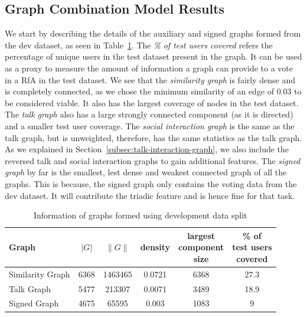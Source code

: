 \subsection{Graph Combination Model Results}
We start by describing the details of the auxiliary and signed graphs formed from the dev dataset, as seen in Table~\ref{tab:test-graphs}.
The \textit{\% of test users covered} refers the percentage of unique users in the test dataset present in the graph. 
It can be used as a proxy to measure the amount of information a graph can provide to a vote in a RfA in the test dataset.
We see that the \textit{similarity graph} is fairly dense and is completely connected, as we chose the minimum similarity of an edge of $0.03$ to be considered viable.
It also has the largest coverage of nodes in the test dataset.
The \textit{talk graph} also has a large strongly connected component (as it is directed) and a smaller test user coverage.
The \textit{social interaction graph} is the same as the talk graph, but is unweighted, therefore, has the same statistics as the talk graph.
As we explained in Section~\ref{subsec:talk-interaction-graph}, we also include the reversed talk and social interaction graphs to gain additional features.
The \textit{signed graph} by far is the smallest, lest dense and weakest connected graph of all the graphs.
This is because, the signed graph only contains the voting data from the dev dataset.
It will contribute the triadic feature and is hence fine for that task.

\begin{table}[htp]
    \centering
    \caption{Information of graphs formed using development data split}
    \label{tab:test-graphs}
    \begin{tabular}{lccccc}
        \toprule
        Graph & $|G|$ & $\|G\|$ & density & \shortstack{largest\\  component \\size} & \shortstack{\% of \\test users\\ covered}\\ 
        \midrule
        
        Similarity Graph & 6368 &1463465 & 0.0721 & 6368 & 27.3\\
        
        Talk Graph & 5477 & 213307 & 0.0071 & 3489 & 18.9\\

        Signed Graph & 4675 & 65595 & 0.003 & 1083 & 9\\

        \bottomrule
        \end{tabular}
\end{table}

